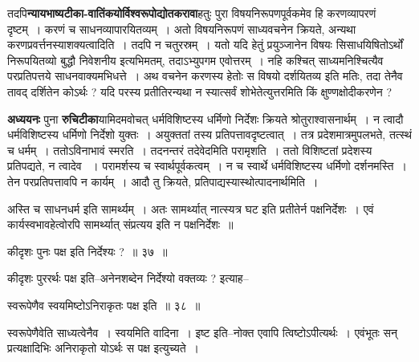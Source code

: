 \documentclass[article,12pt,a4paper]{memoir}
\begin{document}
	  \endgroup
	

	  \pstart तदपि\textbf{न्यायभाष्यटीका-वातिंकयोर्विश्वरूपोद्योतकरावा}हतुः पुरा विषयनिरूपणपूर्वकमेव हि करणव्यापरणं दृष्टम् । करणं च साधनव्यापारयितव्यम् । अतो विषयनिरूपणं साध्यवचनेन क्रियते, अन्यथा करणप्रवर्त्तनस्याशक्यत्वादिति । तदपि न चतुरस्रम् । यतो यदि हेतुं प्रयुञ्जानेन विषयः सिसाधयिषितोऽर्थों निरूपयितव्यो बुद्धौ निवेशनीय इत्यभिमतम्, तदाऽभ्युपगम एवोत्तरम् । नहि कश्चित् साध्यमनिश्चित्यैव परप्रतिपत्तये साधनवाक्यमभिधत्ते । अथ वचनेन करणस्य हेतोः स विषयो दर्शयितव्य इति मतिः, तदा तेनैव तावद् दर्शितेन कोऽर्थः ? यदि परस्य प्रतीतिरन्यथा न स्यात्सर्वं शोभेतेत्युत्तरमिति किं क्षुण्णक्षोदीकरणेन ?
	\pend
      

	  \pstart \textbf{अध्ययनः} पुना \textbf{रुचिटीका}यामिदमवोचत् धर्मविशिष्टस्य धर्मिणो निर्देशः क्रियते श्रोतुराश्वासनार्थम् । न त्वादौ धर्मविशिष्टस्य धर्मिणो निर्देशो युक्तः । अयुक्ततां  तस्य प्रतिपत्तावदृष्टत्वात् । तत्र प्रदेशमात्रमुपलभते, तत्स्थं च धर्मम् । ततोऽविनाभावं स्मरति । तदनन्तरं तदेवेदमिति परामृशति । ततो विशिष्टतां प्रदेशस्य प्रतिपद्यते, न त्वादेव  । परामर्शस्य च स्वार्थपूर्वकत्वम् । न च स्वार्थे धर्मविशिष्टस्य धर्मिणो दर्शनमस्ति । तेन परप्रतिपत्तावपि न कार्यम् । आदौ तु क्रियते, प्रतिपाद्यस्यास्थोत्पादनार्थमिति ।  \leavevmode{} 
	  
	अस्ति च साधनधर्म इति सामर्थ्यम् । अतः सामर्थ्यात् नात्स्यत्र घट इति प्रतीतेर्न पक्षनिर्देशः । एवं कार्यस्वभावहेत्वोरपि सामर्थ्यात् संप्रत्यय इति न पक्षनिर्देशः ॥  
	  
	कीदृशः पुनः पक्ष इति निर्देश्यः ? ॥ ३७ ॥ 
	  
	कीदृशः पुररर्थः पक्ष इति--अनेनशब्देन निर्देश्यो वक्तव्यः ? इत्याह--  
	  
	स्वरूपेणैव स्वयमिष्टोऽनिराकृतः पक्ष इति ॥ ३८ ॥ 
	  
	स्वरूपेणैवेति साध्यत्वेनैव । स्वयमिति वादिना । इष्ट इति--नोक्त एवापि त्विष्टोऽपीत्यर्थः । एवंभूतः सन् प्रत्यक्षादिभिः अनिराकृतो योऽर्थः स पक्ष इत्युच्यते ।  
	  
\end{document}
